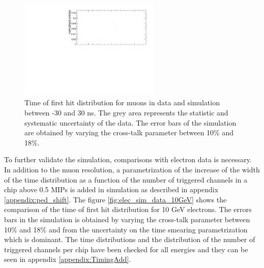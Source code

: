\begin{figure}[htbp!]
	\centering
	\includegraphics[width=0.6\textwidth]{../Thesis_Plots/Timing/Muons/Plots/Comparison_MokkaDD4hepData_Muons.pdf}
	\caption{Time of first hit distribution for muons in data and simulation between -30 and 30 ns. The grey area represents the statistic and systematic uncertainty of the data. The error bars of the simulation are obtained by varying the cross-talk parameter between 10\% and 18\%.}
	\label{fig:sim_data_muon}
\end{figure}

To further validate the simulation, comparisons with electron data is necessary. In addition to the muon resolution, a parametrization of the increase of the width of the time distribution as a function of the number of triggered channels in a chip above 0.5 MIPs is added in simulation as described in appendix \ref{appendix:ped_shift}. The figure \ref{fig:elec_sim_data_10GeV} shows the comparison of the time of first hit distribution for 10 GeV electrons. The errors bars in the simulation is obtained by varying the cross-talk parameter between 10\% and 18\% and from the uncertainty on the time smearing parametrization which is dominant. The time distributions and the distribution of the number of triggered channels per chip have been checked for all energies and they can be seen in appendix \ref{appendix:TimingAdd}.

